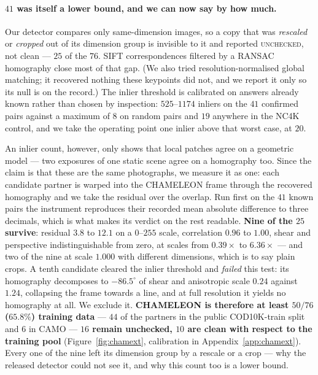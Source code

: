 \documentclass{article} %
\begin{document}
\paragraph{$41$ was itself a lower bound, and we can now say by how much.} Our detector compares
only same-dimension images, so a copy that was \emph{rescaled} or \emph{cropped} out of its dimension
group is invisible to it and reported \textsc{unchecked}, not clean --- $25$ of the $76$. SIFT
correspondences filtered by a RANSAC homography close most of that gap. (We also tried
resolution-normalised global matching; it recovered nothing these keypoints did not, and we report
it only so its null is on the record.) The inlier threshold is calibrated on answers already known
rather than chosen by inspection: $525$--$1174$ inliers on the $41$ confirmed pairs against a
maximum of $8$ on random pairs and $19$ anywhere in the NC4K control, and we take the operating
point one inlier above that worst case, at $20$.

An inlier count, however, only shows that local patches agree on a geometric model --- two exposures
of one static scene agree on a homography too. Since the claim is that these are the same
photographs, we measure it as one: each candidate partner is warped into the CHAMELEON frame through
the recovered homography and we take the residual over the overlap. Run first on the $41$ known
pairs the instrument reproduces their recorded mean absolute difference to three decimals, which is
what makes its verdict on the rest readable. \textbf{Nine of the $25$ survive}: residual $3.8$ to
$12.1$ on a $0$--$255$ scale, correlation $0.96$ to $1.00$, shear and perspective indistinguishable
from zero, at scales from $0.39\times$ to $6.36\times$ --- and two of the nine at scale $1.000$ with
different dimensions, which is to say plain crops. A tenth candidate cleared the inlier threshold
and \emph{failed} this test: its homography decomposes to $-86.5^\circ$ of shear and anisotropic
scale $0.24$ against $1.24$, collapsing the frame towards a line, and at full resolution it yields
no homography at all. We exclude it. \textbf{CHAMELEON is therefore at least $50/76$ ($65.8\%$)
training data} --- $44$ of the partners in the public COD10K-train split and $6$ in CAMO ---
\textbf{$16$ remain unchecked, $10$ are clean with respect to the training pool}
(Figure~\ref{fig:chamext}, calibration in Appendix~\ref{app:chamext}). Every one of the nine left its
dimension group by a rescale or a crop --- why the released detector could not see it, and why this
count too is a lower bound.
\end{document}
